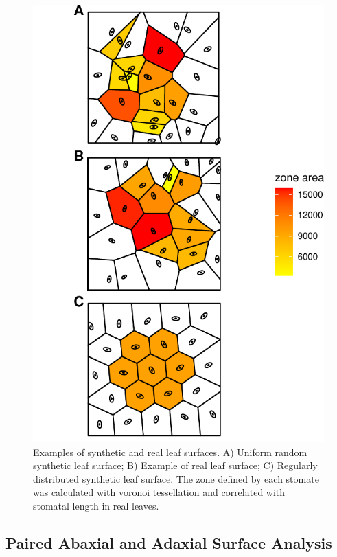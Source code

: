 \documentclass[webpdf,large,modern,unnumsec,namedate]{oup-authoring-template}
\begin{document}
\begin{figure}[ht]
\includegraphics[height = \textheight]{figures/tessellation-example.pdf}
\caption{Examples of synthetic and real leaf surfaces.  A) Uniform random synthetic leaf surface; B) Example of real leaf surface; C) Regularly distributed synthetic leaf surface. The zone defined by each stomate was calculated with voronoi tessellation and correlated with stomatal length in real leaves.}
\label{fig:tessellation-example}
\end{figure}

\hypertarget{paired-abaxial-and-adaxial-surface-analysis}{%
\subsection{Paired Abaxial and Adaxial Surface
Analysis}\label{paired-abaxial-and-adaxial-surface-analysis}}
\end{document}
